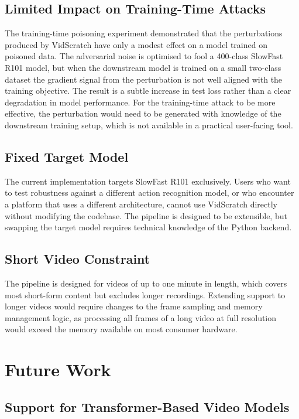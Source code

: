 \subsection{Limited Impact on Training-Time Attacks}

The training-time poisoning experiment demonstrated
that the perturbations produced by VidScratch have
only a modest effect on a model trained on poisoned
data. The adversarial noise is optimised to fool a
400-class SlowFast R101 model, but when the downstream
model is trained on a small two-class dataset the
gradient signal from the perturbation is not well
aligned with the training objective. The result is
a subtle increase in test loss rather than a clear
degradation in model performance. For the training-time
attack to be more effective, the perturbation would
need to be generated with knowledge of the downstream
training setup, which is not available in a practical
user-facing tool.

\subsection{Fixed Target Model}

The current implementation targets SlowFast R101
exclusively. Users who want to test robustness
against a different action recognition model, or
who encounter a platform that uses a different
architecture, cannot use VidScratch directly without
modifying the codebase. The pipeline is designed to
be extensible, but swapping the target model requires
technical knowledge of the Python backend.

\subsection{Short Video Constraint}

The pipeline is designed for videos of up to one
minute in length, which covers most short-form
content but excludes longer recordings. Extending
support to longer videos would require changes to
the frame sampling and memory management logic,
as processing all frames of a long video at full
resolution would exceed the memory available on
most consumer hardware.

\section{Future Work}
\label{section:future-work}

\subsection{Support for Transformer-Based Video Models}

